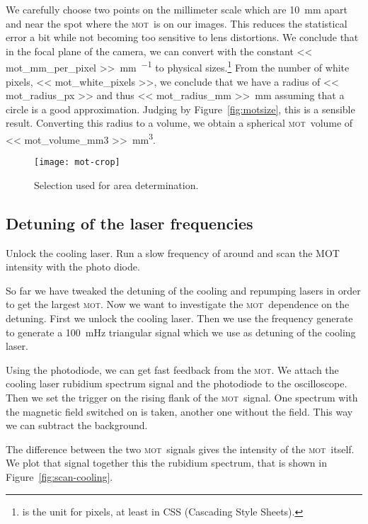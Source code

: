 \documentclass[11pt, english, fleqn, DIV=15, headinclude, BCOR=2cm]{scrreprt}
\newcommand\mot{\textsc{mot}}
\begin{document}
We carefully choose two points on the millimeter scale which are
\SI{10}{\milli\meter} apart and near the spot where the \mot\ is on our images.
This reduces the statistical error a bit while not becoming too sensitive to
lens distortions. We conclude that in the focal plane of the camera, we can
convert with the constant \SI{<< mot_mm_per_pixel >>}{\milli\meter\per\pixel}
to physical sizes.\footnote{\si{\pixel} is the unit for pixels, at least in CSS
(Cascading Style Sheets).} From the number of white pixels, \num{<<
mot_white_pixels >>}, we conclude that we have a radius of \SI{<< mot_radius_px
>>}{\pixel} and thus \SI{<< mot_radius_mm >>}{\milli\meter} assuming that a
circle is a good approximation. Judging by Figure~\ref{fig:motsize}, this is a
sensible result. Converting this radius to a volume, we obtain a spherical
\mot\ volume of \SI{<< mot_volume_mm3 >>}{\milli\meter\cubed}.

\begin{figure}
    \centering
    \texttt{[image: mot-crop]}
    \caption{%
        Selection used for area determination.
    }
    \label{fig:mot-crop}
\end{figure}

\subsection{Detuning of the laser frequencies}

Unlock the cooling laser. Run a slow frequency of around
and scan the MOT intensity with the photo diode. 

So far we have tweaked the detuning of the cooling and repumping lasers in
order to get the largest \mot. Now we want to investigate the \mot\ dependence
on the detuning. First we unlock the cooling laser. Then we use the frequency
generate to generate a \SI{100}{\milli\hertz} triangular signal which we use
as detuning of the cooling laser.

Using the photodiode, we can get fast feedback from the \mot. We attach the
cooling laser rubidium spectrum signal and the photodiode to the oscilloscope.
Then we set the trigger on the rising flank of the \mot\ signal. One spectrum
with the magnetic field switched on is taken, another one without the field.
This way we can subtract the background.

The difference between the two \mot\ signals gives the intensity of the \mot\
itself. We plot that signal together this the rubidium spectrum, that is shown
in Figure~\ref{fig:scan-cooling}.
\end{document}
